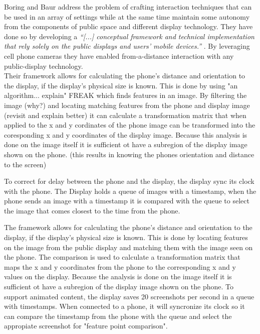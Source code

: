 Boring and Baur address the problem of crafting interaction techniques that can be used in an array of settings while at the same time maintain some autonomy from the components of public space and different display technology. %
They have done so by developing a \emph{``[...] conceptual framework and technical implementation that rely solely on the public displays and users' mobile devices.''} \cite{Boring:2013}. By  leveraging cell phone cameras they have enabled from-a-distance interaction with any public-display technology.\\
Their framework allows for calculating the phone's distance and orientation to the display, if the display's physical size is known.
This is done by using "an algorithm... explain" FREAK which finds features
in an image. By filtering the image (why?) and locating matching features
from the phone and display image (revisit and explain better) it can calculate
a transformation matrix that when applied to the x and y cordinates of the 
phone image can be transformed into the coresponding x and y coordinates
of the display image.
Because this analysis is done on the image itself  it is sufficient ot have a
subregion of the display image shown on the phone.
(this  results in knowing the phones orientation and distance to  the screen)

To correct for delay between the phone and the display, the display sync
its clock with the phone. The Display holds a queue of images with a
timestamp, when the phone sends an image with a timestamp it
is compared with the queue to select the image that comes closest to
the time from the phone.

The framework allows for calculating the phone's distance and orientation to the display, if the display's physical size is known.
This is done by locating features on the image from the public display and matching them with the image seen on the phone. The comparison is used to calculate a transformation matrix that maps the x and y coordinates from the phone to the corresponding x and y values on the display. Because the analysis is done on the image itself  it is sufficient ot have a subregion of the display image shown on the phone.
To support animated content, the display saves 20 screenshots per second%
 in a queue with timestamps. When connected to a phone, it will syncronize its clock so it can compare the timestamp from the phone with the queue and select the appropiate screenshot for "feature point comparison". %


